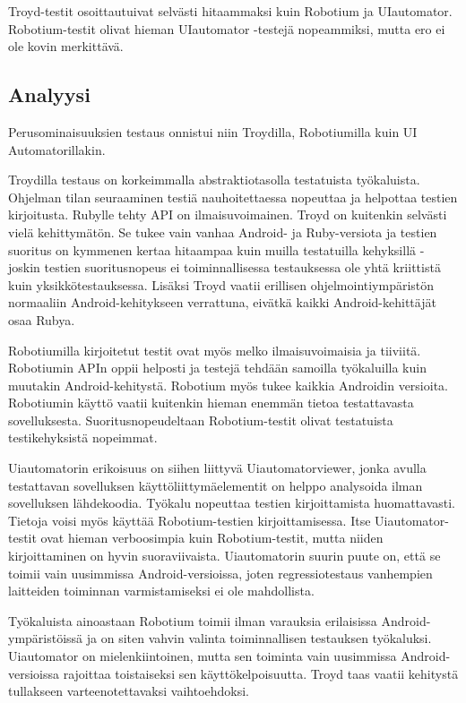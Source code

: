 Troyd-testit osoittautuivat selvästi hitaammaksi kuin Robotium ja UIautomator. Robotium-testit olivat hieman UIautomator -testejä nopeammiksi, mutta ero ei ole kovin merkittävä.

\subsection{Analyysi}

Perusominaisuuksien testaus onnistui niin Troydilla, Robotiumilla kuin UI Automatorillakin.

Troydilla testaus on korkeimmalla abstraktiotasolla testatuista työkaluista. Ohjelman tilan seuraaminen testiä nauhoitettaessa nopeuttaa ja helpottaa testien kirjoitusta. Rubylle tehty API on ilmaisuvoimainen. Troyd on kuitenkin selvästi vielä kehittymätön. Se tukee vain vanhaa Android- ja Ruby-versiota ja testien suoritus on kymmenen kertaa hitaampaa kuin muilla testatuilla kehyksillä - joskin testien suoritusnopeus ei toiminnallisessa testauksessa ole yhtä kriittistä kuin yksikkötestauksessa. Lisäksi Troyd vaatii erillisen ohjelmointiympäristön normaaliin Android-kehitykseen verrattuna, eivätkä kaikki Android-kehittäjät osaa Rubya.

Robotiumilla kirjoitetut testit ovat myös melko ilmaisuvoimaisia ja tiiviitä. Robotiumin APIn oppii helposti ja testejä tehdään samoilla työkaluilla kuin muutakin Android-kehitystä. Robotium myös tukee kaikkia Androidin versioita. Robotiumin käyttö vaatii kuitenkin hieman enemmän tietoa testattavasta sovelluksesta. Suoritusnopeudeltaan Robotium-testit olivat testatuista testikehyksistä nopeimmat.

Uiautomatorin erikoisuus on siihen liittyvä Uiautomatorviewer, jonka avulla testattavan sovelluksen käyttöliittymäelementit on helppo analysoida ilman sovelluksen lähdekoodia. Työkalu nopeuttaa testien kirjoittamista huomattavasti. Tietoja voisi myös käyttää Robotium-testien kirjoittamisessa. Itse Uiautomator-testit ovat hieman verboosimpia kuin Robotium-testit, mutta niiden kirjoittaminen on hyvin suoraviivaista. Uiautomatorin suurin puute on, että se toimii vain uusimmissa Android-versioissa, joten regressiotestaus vanhempien laitteiden toiminnan varmistamiseksi ei ole mahdollista.

Työkaluista ainoastaan Robotium toimii ilman varauksia erilaisissa Android-ympäristöissä ja on siten vahvin valinta toiminnallisen testauksen työkaluksi. Uiautomator on mielenkiintoinen, mutta sen toiminta vain uusimmissa Android-versioissa rajoittaa toistaiseksi sen käyttökelpoisuutta. Troyd taas vaatii kehitystä tullakseen varteenotettavaksi vaihtoehdoksi.